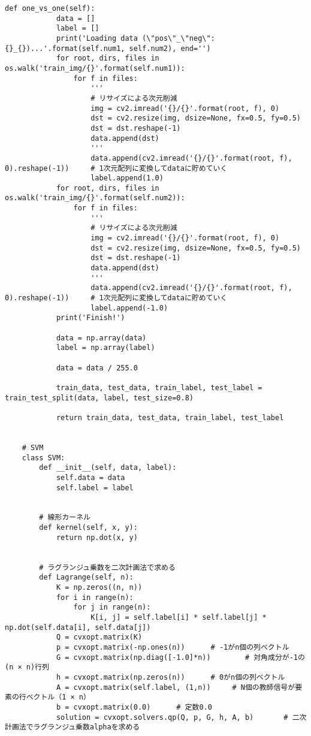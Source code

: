 \begin{lstlisting}[caption=課題2のMNISTの数字画像識別におけるSVM学習用プログラム]
        def one_vs_one(self):
            data = []
            label = []
            print('Loading data (\"pos\"_\"neg\":{}_{})...'.format(self.num1, self.num2), end='')
            for root, dirs, files in os.walk('train_img/{}'.format(self.num1)):
                for f in files:
                    '''
                    # リサイズによる次元削減
                    img = cv2.imread('{}/{}'.format(root, f), 0)
                    dst = cv2.resize(img, dsize=None, fx=0.5, fy=0.5)
                    dst = dst.reshape(-1)
                    data.append(dst)
                    '''
                    data.append(cv2.imread('{}/{}'.format(root, f), 0).reshape(-1))     # 1次元配列に変換してdataに貯めていく
                    label.append(1.0)
            for root, dirs, files in os.walk('train_img/{}'.format(self.num2)):
                for f in files:
                    '''
                    # リサイズによる次元削減
                    img = cv2.imread('{}/{}'.format(root, f), 0)
                    dst = cv2.resize(img, dsize=None, fx=0.5, fy=0.5)
                    dst = dst.reshape(-1)
                    data.append(dst)
                    '''
                    data.append(cv2.imread('{}/{}'.format(root, f), 0).reshape(-1))     # 1次元配列に変換してdataに貯めていく
                    label.append(-1.0)
            print('Finish!')
            
            data = np.array(data)
            label = np.array(label)

            data = data / 255.0

            train_data, test_data, train_label, test_label = train_test_split(data, label, test_size=0.8)
            
            return train_data, test_data, train_label, test_label


    # SVM
    class SVM:
        def __init__(self, data, label):
            self.data = data
            self.label = label
        

        # 線形カーネル
        def kernel(self, x, y):
            return np.dot(x, y)


        # ラグランジュ乗数を二次計画法で求める
        def Lagrange(self, n):
            K = np.zeros((n, n))
            for i in range(n):
                for j in range(n):
                    K[i, j] = self.label[i] * self.label[j] * np.dot(self.data[i], self.data[j])
            Q = cvxopt.matrix(K)
            p = cvxopt.matrix(-np.ones(n))      # -1がn個の列ベクトル
            G = cvxopt.matrix(np.diag([-1.0]*n))        # 対角成分が-1の(n × n)行列
            h = cvxopt.matrix(np.zeros(n))      # 0がn個の列ベクトル
            A = cvxopt.matrix(self.label, (1,n))     # N個の教師信号が要素の行ベクトル（1 × n）
            b = cvxopt.matrix(0.0)      # 定数0.0
            solution = cvxopt.solvers.qp(Q, p, G, h, A, b)       # 二次計画法でラグランジュ乗数alphaを求める


\end{lstlisting}
